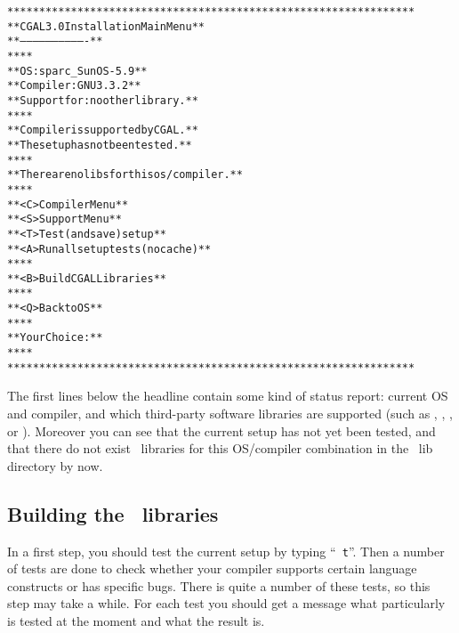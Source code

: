 {\ccTexHtml{\scriptsize}{} \label{pic:main-menu}
\begin{alltt}
  ****************************************************************
  **              CGAL 3.0 Installation Main Menu               **
  **              -------------------------------               **
  **                                                            **
  **   OS:                  sparc_SunOS-5.9                     **
  **   Compiler:            GNU 3.3.2                           **
  **   Support for:         no other library.                   **
  **                                                            **
  **   Compiler is supported by CGAL.                           **
  **   The setup has not been tested.                           **
  **                                                            **
  **   There are no libs for this os/compiler.                  **
  **                                                            **
  **   <C>  Compiler Menu                                       **
  **   <S>  Support Menu                                        **
  **   <T>  Test (and save) setup                               **
  **   <A>  Run all setup tests (no cache)                      **
  **                                                            **
  **   <B>  Build CGAL Libraries                                **
  **                                                            **
  **   <Q>  Back to OS                                          **
  **                                                            **
  **   Your Choice:                                             **
  **                                                            **
  ****************************************************************
\end{alltt}}

The first lines below the headline contain some kind of status report:
current OS and compiler, and which third-party software libraries are
supported (such as \gmp, \core, \leda, or \qt). Moreover you can see
that the current setup has not yet been tested, and that there do not
exist \cgal\ libraries for this OS/compiler combination in the \cgal\ 
lib directory by now.

\subsection{Building the \cgal\ libraries}\label{sec:test-the-setup}

In a first step, you should test the current setup by typing ``{\tt
  t}''. Then a number of tests are done to check whether your compiler
supports certain language constructs or has specific bugs. There is
quite a number of these tests, so this step may take a while. For each
test you should get a message what particularly is tested at the
moment and what the result is.

